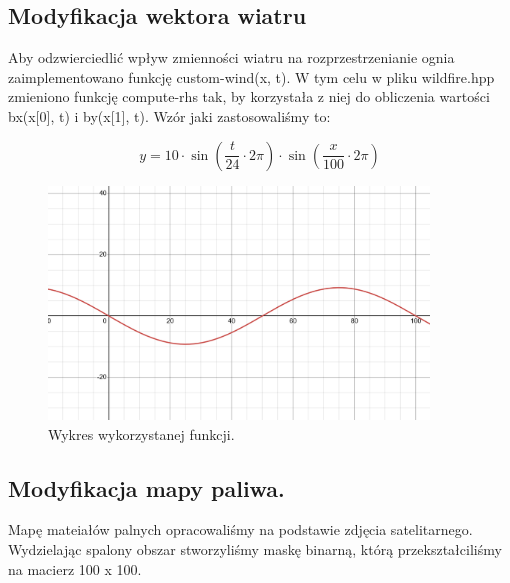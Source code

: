 \documentclass[a4paper,12pt]{article}
\begin{document}
\subsection{Modyfikacja wektora wiatru}
Aby odzwierciedlić wpływ zmienności wiatru na rozprzestrzenianie ognia zaimplementowano funkcję custom-wind(x, t). W tym celu w pliku wildfire.hpp  zmieniono funkcję compute-rhs tak, by korzystała z niej do obliczenia wartości bx(x[0], t) i by(x[1], t). Wzór jaki zastosowaliśmy to:

\[
y = 10 \cdot\sin\left(\frac{t}{24} \cdot 2\pi\right) \cdot \sin\left(\frac{x}{100} \cdot 2\pi\right)
\]

\begin{figure}[h]
    \centering
    \includegraphics[width=0.9\textwidth]{wind graph.png}
    \caption{Wykres wykorzystanej funkcji.}
    \label{fig:example}
\end{figure}
\newpage

\subsection{Modyfikacja mapy paliwa.}
Mapę mateiałów palnych opracowaliśmy na podstawie zdjęcia satelitarnego. Wydzielając spalony obszar stworzyliśmy maskę binarną, którą przekształciliśmy na macierz 100 x 100. 
\end{document}
